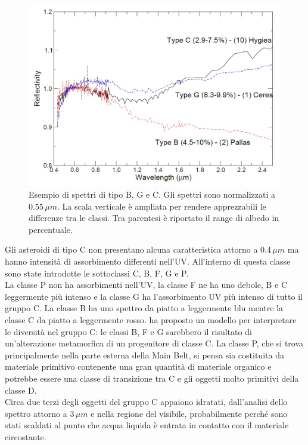 \begin{figure}[!h]
    \centering
    \includegraphics[scale=0.3]{figure/spettro_bgc.jpg}
    \caption[Esempio di spettri di tipo B, G e C.]{Esempio di spettri di tipo B, G e C. Gli spettri sono normalizzati a $0.55\,\mu m$. La scala verticale è ampliata per rendere apprezzabili le differenze tra le classi. Tra parentesi è riportato il range di albedo in percentuale. \citep{magrin_spectroscopic_nodate}}
    \label{spettro_bgc}
\end{figure}

Gli asteroidi di tipo C non presentano alcuna caratteristica attorno a $0.4\,\mu m$ ma hanno intensità di assorbimento differenti nell'UV. All'interno di questa classe sono state introdotte le sottoclassi C, B, F, G e P.\\
La classe P non ha assorbimenti nell'UV, la classe F ne ha uno debole, B e C leggermente più intenso e la classe G ha l'assorbimento UV più intenso di tutto il gruppo C. La classe B ha uno spettro da piatto a leggermente blu mentre la classe C da piatto a leggermente rosso. \citet{bell_asteroids_1989} ha proposto un modello per interpretare le diversità nel gruppo C: le classi B, F e G sarebbero il risultato di un'alterazione metamorfica di un progenitore di classe C. La classe P, che si trova principalmente nella parte esterna della Main Belt, si pensa sia costituita da materiale primitivo contenente una gran quantità di materiale organico e potrebbe essere una classe di transizione tra C e gli oggetti molto primitivi della classe D.\\
Circa due terzi degli oggetti del gruppo C appaiono idratati, dall'analisi dello spettro attorno a $3\,\mu m$ e nella regione del visibile, probabilmente perché sono stati scaldati al punto che acqua liquida è entrata in contatto con il materiale circostante.

